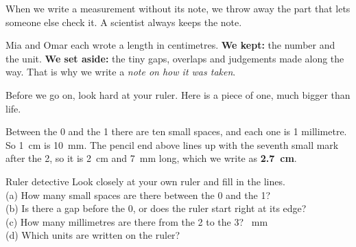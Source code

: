 When we write a measurement without its note, we throw away the part that lets someone else check it. A scientist always keeps the note.

\begin{keepbox}
Mia and Omar each wrote a length in centimetres. \textbf{We kept:} the number and the unit. \textbf{We set aside:} the tiny gaps, overlaps and judgements made along the way. That is why we write a \emph{note on how it was taken}.
\end{keepbox}

Before we go on, look hard at your ruler. Here is a piece of one, much bigger than life.

\begin{center}
\end{center}

Between the 0 and the 1 there are ten small spaces, and each one is 1 millimetre. So 1~cm is 10~mm. The pencil end above lines up with the seventh small mark after the 2, so it is 2~cm and 7~mm long, which we write as \textbf{2.7~cm}.

\begin{tryit}{Ruler detective}
Look closely at your own ruler and fill in the lines.\\[4pt]
(a) How many small spaces are there between the 0 and the 1? \wline[1.5cm]\\[3pt]
(b) Is there a gap before the 0, or does the ruler start right at its edge? \wline[2.5cm]\\[3pt]
(c) How many millimetres are there from the 2 to the 3? \wline[1.5cm]~mm\\[3pt]
(d) Which units are written on the ruler? \wline[3cm]
\end{tryit}


